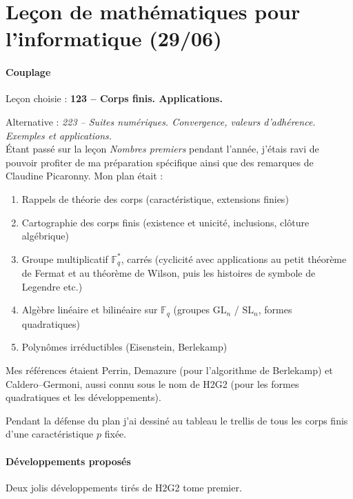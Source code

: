 \documentclass[a4paper, 11pt]{article}
\begin{document}
\newpage

\section*{Leçon de mathématiques pour l'informatique (29/06)}

\def\F{\mathbb{F}}
\def\Z{\mathbb{Z}}
\def\GL{\mathrm{GL}}
\def\SL{\mathrm{SL}}
\def\PSL{\mathrm{PSL}}
\def\Sigmap{\mathfrak{S}}

\paragraph{Couplage}

Leçon choisie : \textbf{123 -- Corps finis. Applications.}

Alternative : \emph{223 -- Suites numériques. Convergence, valeurs d'adhérence.
  Exemples et applications.}\\

Étant passé sur la leçon \emph{Nombres premiers} pendant l'année, j'étais ravi
de pouvoir profiter de ma préparation spécifique ainsi que des remarques de
Claudine Picaronny. Mon plan était :
\begin{enumerate}
\item Rappels de théorie des corps (caractéristique, extensions finies)
\item Cartographie des corps finis (existence et unicité, inclusions, clôture
  algébrique)
\item Groupe multiplicatif $\F_q^*$, carrés (cyclicité avec applications au
  petit théorème de Fermat et au théorème de Wilson, puis les histoires de
  symbole de Legendre etc.)
\item Algèbre linéaire et bilinéaire sur $\F_q$ (groupes $\GL_n$ / $\SL_n$,
  formes quadratiques)
\item Polynômes irréductibles (Eisenstein, Berlekamp)
\end{enumerate}
Mes références étaient Perrin, Demazure (pour l'algorithme de Berlekamp) et
Caldero--Germoni, aussi connu sous le nom de H2G2 (pour les formes quadratiques
et les développements).

Pendant la défense du plan j'ai dessiné au tableau le trellis de tous les corps
finis d'une caractéristique $p$ fixée.



\paragraph{Développements proposés} Deux jolis développements tirés de H2G2 tome
premier.
\end{document}
